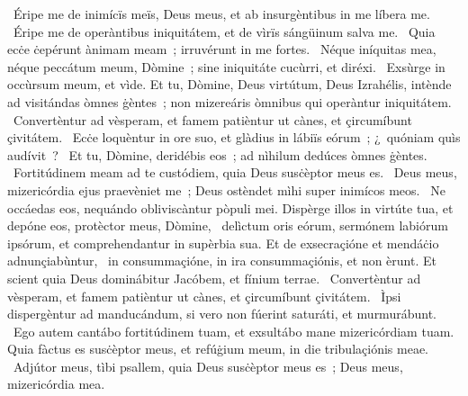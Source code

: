 ~Éripe me de inimícïs meïs, Deus meus, et ab insurgèntibus in me líbera me. 
~Éripe me de operàntibus iniquitátem, et de vìrïs sángüinum salva me. 
~Quia ecċe ċepérunt ànimam meam~; irruvérunt in me fortes. 
~Néque iníquitas mea, néque peccátum meum, Dòmine~; sine iniquitáte cucùrri, et diréxi. 
~Exsùrge in occùrsum meum, et vìde. Et tu, Dòmine, Deus virtútum, Deus Izrahélis, intènde ad visitándas òmnes ġèntes~; non mizereáris òmnibus qui operàntur iniquitátem. 
~Convertèntur ad vèsperam, et famem patièntur ut cànes, et çircumíbunt çivitátem. 
~Ecċe loquèntur in ore suo, et glàdius in lábiïs eórum~; ¿~quóniam quìs audívit~? 
~Et tu, Dòmine, deridébis eos~; ad nìhilum dedúces òmnes ġèntes. 
~Fortitúdinem meam ad te custódiem, quia Deus susċèptor meus es. 
~Deus meus, mizericórdia ejus praevèniet me~; Deus ostèndet mìhi super inimícos meos. 
~Ne occáedas eos, nequándo obliviscàntur pòpuli mei. Dispèrge illos in virtúte tua, et depóne eos, protèctor meus, Dòmine, 
~delìctum oris eórum, sermónem labiórum ipsórum, et comprehendantur in supèrbia sua. Et de exsecraçióne et mendáċio adnunçiabùntur, 
~in consummaçióne, in ira consummaçiónis, et non èrunt. Et scient quia Deus dominábitur Jacóbem, et fínium terrae. 
~Convertèntur ad vèsperam, et famem patièntur ut cànes, et çircumíbunt çivitátem. 
~Ìpsi dispergèntur ad manducándum, si vero non fúerint saturáti, et murmurábunt. 
~Ego autem cantábo fortitúdinem tuam, et exsultábo mane mizericórdiam tuam. Quia fàctus es susċèptor meus, et refúġium meum, in die tribulaçiónis meae. 
~Adjútor meus, tìbi psallem, quia Deus susċèptor meus es~; Deus meus, mizericórdia mea. 

